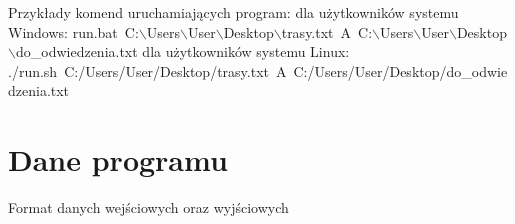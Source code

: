 \documentclass[10pt,oneside]{article}
\begin{document}
Przykłady komend uruchamiających program:
\newline
dla użytkowników systemu Windows:
\newline
run.bat~C:$\backslash$Users$\backslash$User$\backslash$Desktop$\backslash$trasy.txt~A~C:$\backslash$Users$\backslash$User$\backslash$Desktop$\backslash$do\_odwiedzenia.txt
\newline
\newline
dla użytkowników systemu Linux:
\newline
./run.sh~C:/Users/User/Desktop/trasy.txt~A~C:/Users/User/Desktop/do\_odwiedzenia.txt

\section{Dane programu}
Format danych wejściowych oraz wyjściowych
\end{document}
